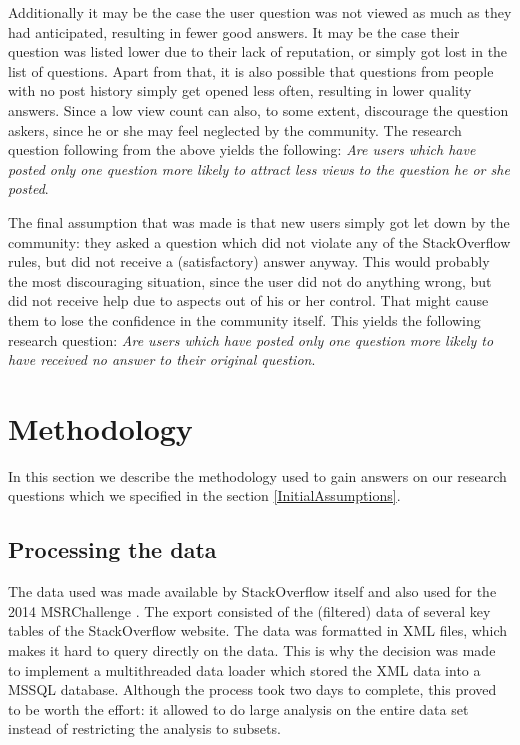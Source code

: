 \documentclass[conference]{IEEEtran}
\begin{document}
Additionally it may be the case the user question was not viewed as much as they had anticipated, resulting in fewer good answers. It may be the case their question was listed lower due to their lack of reputation, or simply got lost in the list of questions. Apart from that, it is also possible that questions from people with no post history simply get opened less often, resulting in lower quality answers. Since a low view count can also, to some extent, discourage the question askers, since he or she may feel neglected by the community. The research question following from the above yields the following: \textit{Are users which have posted only one question more likely to attract less views to the question he or she posted}.

The final assumption that was made is that new users simply got let down by the community: they asked a question which did not violate any of the StackOverflow rules, but did not receive a (satisfactory) answer anyway. This would probably the most discouraging situation, since the user did not do anything wrong, but did not receive help due to aspects out of his or her control. That might cause them to lose the confidence in the community itself. This yields the following research question: \textit{Are users which have posted only one question more likely to have received no answer to their original question}. 

\section{Methodology} \label{Methodology}

In this section we describe the methodology used to gain answers on our research questions which we specified in the section \ref{InitialAssumptions}.

\subsection{Processing the data}

The data used was made available by StackOverflow itself and also used for the 2014 MSRChallenge \cite{MSRChallenge2015}. The export consisted of the (filtered) data of several key tables of the StackOverflow website. The data was formatted in XML files, which makes it hard to query directly on the data. This is why the decision was made to implement a multithreaded data loader which stored the XML data into a MSSQL database. Although the process took two days to complete, this proved to be worth the effort: it allowed to do large analysis on the entire data set instead of restricting the analysis to subsets.
\end{document}
